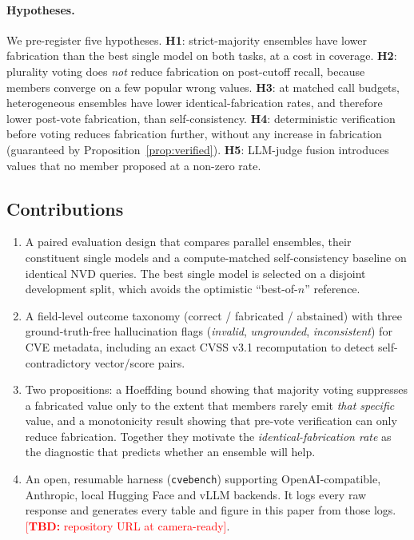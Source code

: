 \documentclass[11pt]{article}
\newcommand{\TBD}[1]{\textcolor{red}{[\textbf{TBD:} #1]}}
\begin{document}
\paragraph{Hypotheses.} We pre-register five hypotheses. \textbf{H1}: strict-majority ensembles have lower fabrication than the best single model on both tasks, at a cost in coverage. \textbf{H2}: plurality voting does \emph{not} reduce fabrication on post-cutoff recall, because members converge on a few popular wrong values. \textbf{H3}: at matched call budgets, heterogeneous ensembles have lower identical-fabrication rates, and therefore lower post-vote fabrication, than self-consistency. \textbf{H4}: deterministic verification before voting reduces fabrication further, without any increase in fabrication (guaranteed by Proposition~\ref{prop:verified}). \textbf{H5}: LLM-judge fusion introduces values that no member proposed at a non-zero rate.

\subsection{Contributions}
\begin{enumerate}[leftmargin=2.2em]
\item A paired evaluation design that compares parallel ensembles, their constituent single models and a compute-matched self-consistency baseline on identical NVD queries. The best single model is selected on a disjoint development split, which avoids the optimistic ``best-of-$n$'' reference.
\item A field-level outcome taxonomy (correct / fabricated / abstained) with three ground-truth-free hallucination flags (\emph{invalid}, \emph{ungrounded}, \emph{inconsistent}) for CVE metadata, including an exact CVSS v3.1 recomputation to detect self-contradictory vector/score pairs.
\item Two propositions: a Hoeffding bound showing that majority voting suppresses a fabricated value only to the extent that members rarely emit \emph{that specific} value, and a monotonicity result showing that pre-vote verification can only reduce fabrication. Together they motivate the \emph{identical-fabrication rate} as the diagnostic that predicts whether an ensemble will help.
\item An open, resumable harness (\texttt{cvebench}) supporting OpenAI-compatible, Anthropic, local Hugging Face and vLLM backends. It logs every raw response and generates every table and figure in this paper from those logs. \TBD{repository URL at camera-ready}.
\end{enumerate}
\end{document}
